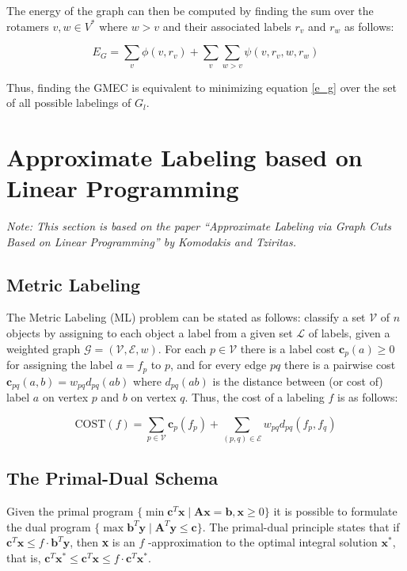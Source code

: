 \documentclass[11pt]{article}
\begin{document}
	The energy of the graph can then be computed by finding the sum over the rotamers 
	$v,w\in V^*$ where $w > v$ and their associated labels $r_v$ and $r_w$ as
	follows:
	
	\begin{equation} \label{e_g}
	    E_G = 
	    \sum\limits_{v} \phi(v, r_v) + 
	    \sum\limits_{v} \sum\limits_{w > v} \psi(v,r_v, w, r_w)
	   \end{equation}
	
	Thus, finding the GMEC is equivalent to minimizing equation \ref{e_g}
	over the set of all possible labelings of $G_l$. 
	
	\section{Approximate Labeling based on Linear Programming}
	
	\textit{Note: This section is based on the paper ``Approximate Labeling via
		Graph Cuts Based on Linear Programming'' by Komodakis and Tziritas.}
	
	\subsection{Metric Labeling}
	
	The Metric Labeling (ML) problem can be stated as follows: classify a set 
	$\mathcal{V}$ of $n$ objects by assigning to each object a label from a given
	set $\mathcal{L}$ of labels, given a weighted graph
	$\mathcal{G}=(\mathcal{V},\mathcal{E},w)$. For each $p \in \mathcal{V}$ there
	is a label cost $\textbf{c}_{p}(a) \geq 0$ for assigning the label $a=f_p$ to
	$p$, and for every edge $pq$ there is a pairwise cost
	$\textbf{c}_{pq}(a,b) =  w_{pq}d_{pq}(ab)$ where $d_{pq}(ab)$ is the distance
	between (or cost of) label $a$ on vertex $p$ and $b$ on vertex $q$. Thus,
	the cost of a labeling $f$ is as follows:
	
	\begin{equation} \label{k_cost}
	    \text{COST}(f) = 
	    \sum\limits_{p \in \mathcal{V}} \textbf{c}_{p}(f_p) + 
	    \sum\limits_{(p,q) \in \mathcal{E}} w_{pq}d_{pq}(f_p,f_q)
	   \end{equation}

	\subsection{The Primal-Dual Schema}
	
	Given the primal program $\{\min{\textbf{c}^{T}\textbf{x}} \mid \textbf{Ax}=
	\textbf{b}, \textbf{x}\geq 0\}$ it is possible to formulate the dual program
	$\{\max{\textbf{b}^{T}\textbf{y}} \mid \textbf{A}^T\textbf{y} \leq \textbf{c}\}$.
	The primal-dual principle states that if 
	$\textbf{c}^T\textbf{x} \leq f \cdot \textbf{b}^T\textbf{y}$, then \textbf{x}
	is an $f$ -approximation to the optimal integral solution 
	$\textbf{x}^{\text{*}}$, that is, 
	$\textbf{c}^T\textbf{x}^\text{*} \leq \textbf{c}^T\textbf{x} \leq 
        	f \cdot \textbf{c}^T\textbf{x}^\text{*}$. 
        	
\end{document}

